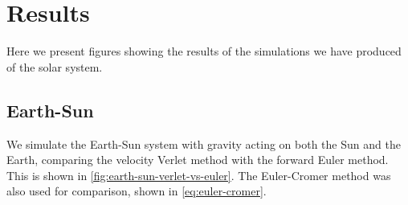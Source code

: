 \documentclass[../main.tex]{subfiles}
\begin{document}
\section{Results}\label{sec:results}

Here we present figures showing the results of the simulations we have produced of the solar system. 

\subsection{Earth-Sun}

We simulate the Earth-Sun system with gravity acting on both the Sun and the Earth, comparing the velocity Verlet method with the forward Euler method. This is shown in \cref{fig:earth-sun-verlet-vs-euler}. The Euler-Cromer method was also used for comparison, shown in \cref{eq:euler-cromer}.

\end{document}
